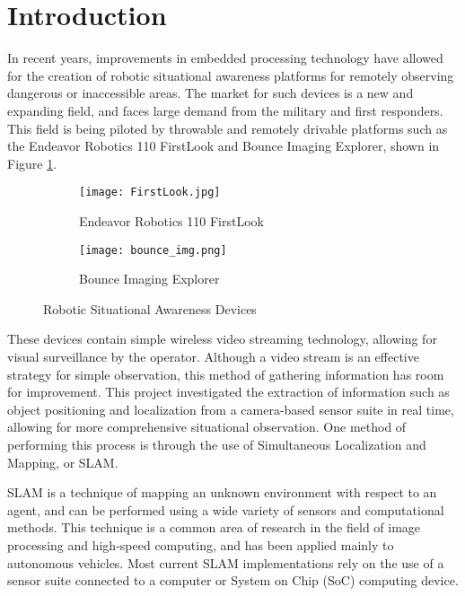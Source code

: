 \section{Introduction}
In recent years, improvements in embedded processing technology have allowed for the creation of robotic situational awareness platforms for remotely observing dangerous or inaccessible areas. The market for such devices is a new and expanding field, and faces large demand from the military and first responders. This field is being piloted by throwable and remotely drivable platforms such as the Endeavor Robotics 110 FirstLook and Bounce Imaging Explorer, shown in Figure \ref{robocop}. 

\par
\begin{figure}[H]
        \begin{subfigure}[h]{0.5\textwidth}
             \centerline{\texttt{[image: FirstLook.jpg]}}
            \caption{Endeavor Robotics 110 FirstLook \cite{endeavor}}
        \end{subfigure}
        \begin{subfigure}[h]{0.5\textwidth}
            \centerline{\texttt{[image: bounce\_img.png]}}
            \caption{Bounce Imaging Explorer \cite{bounceImaging}}
        \end{subfigure}
\caption{Robotic Situational Awareness Devices}
\label{robocop}
\end{figure}
\par
These devices contain simple wireless video streaming technology, allowing for visual surveillance by the operator. Although a video stream is an effective strategy for simple observation, this method of gathering information has room for improvement. This project investigated the extraction of information such as object positioning and localization from a camera-based sensor suite in real time, allowing for more comprehensive situational observation. One method of performing this process is through the use of Simultaneous Localization and Mapping, or SLAM. 
\par
SLAM is a technique of mapping an unknown environment with respect to an agent, and can be performed using a wide variety of sensors and computational methods. This technique is a common area of research in the field of image processing and high-speed computing, and has been applied mainly to autonomous vehicles. Most current SLAM implementations rely on the use of a sensor suite connected to a computer or System on Chip (SoC) computing device. 
